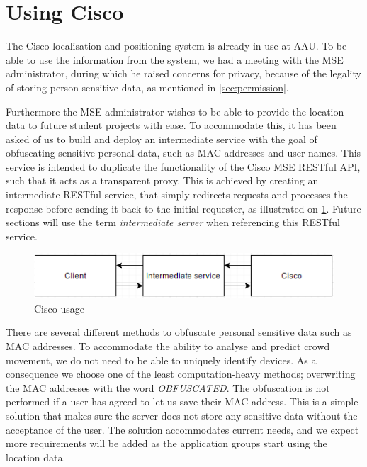 \section{Using Cisco}\label{sec:cisco_usage}
The Cisco localisation and positioning system is already in use at AAU. To be able to use the information from the system, we had a meeting with the MSE administrator, during which he raised concerns for privacy, because of the legality of storing person sensitive data, as mentioned in \cref{sec:permission}. 

Furthermore the MSE administrator wishes to be able to provide the location data to future student projects with ease. To accommodate this, it has been asked of us to build and deploy an intermediate service with the goal of obfuscating sensitive personal data, such as MAC addresses and user names. This service is intended to duplicate the functionality of the Cisco MSE RESTful API, such that it acts as a transparent proxy. This is achieved by creating an intermediate RESTful service, that simply redirects requests and processes the response before sending it back to the initial requester, as illustrated on \cref{fig:cisco_usage}. Future sections will use the term \emph{intermediate server} when referencing this RESTful service.

\begin{figure}[ht]
	\begin{center}
	\includegraphics[scale=0.9]{graphics/cisco_usage.png}
	\caption{Cisco usage}
	\label{fig:cisco_usage}
	\end{center} 
\end{figure}

There are several different methods to obfuscate personal sensitive data such as MAC addresses. To accommodate the ability to analyse and predict crowd movement, we do not need to be able to uniquely identify devices. As a consequence we choose one of the least computation-heavy methods; overwriting the MAC addresses with the word \emph{OBFUSCATED}. The obfuscation is not performed if a user has agreed to let us save their MAC address.
This is a simple solution that makes sure the server does not store any sensitive data without the acceptance of the user. The solution accommodates current needs, and we expect more requirements will be added as the application groups start using the location data.

